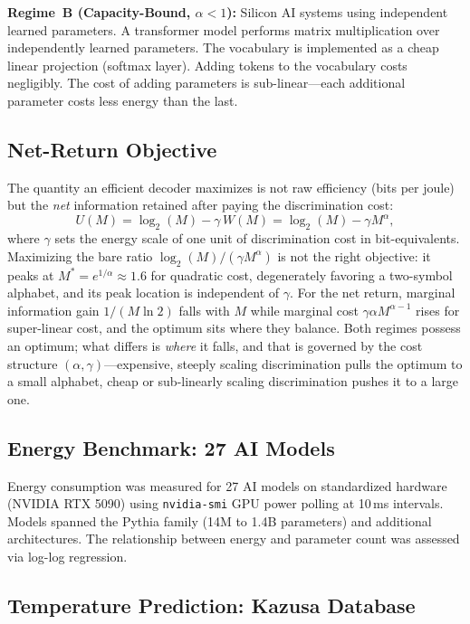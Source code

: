 \documentclass[11pt]{article}
\begin{document}
\textbf{Regime~B (Capacity-Bound, $\alpha < 1$):} Silicon AI systems using independent learned parameters. A transformer model performs matrix multiplication over independently learned parameters. The vocabulary is implemented as a cheap linear projection (softmax layer). Adding tokens to the vocabulary costs negligibly. The cost of adding parameters is sub-linear---each additional parameter costs less energy than the last.

\subsection{Net-Return Objective}

The quantity an efficient decoder maximizes is not raw efficiency (bits per joule) but the \emph{net} information retained after paying the discrimination cost:
\begin{equation}
U(M) = \log_2(M) - \gamma\, W(M) = \log_2(M) - \gamma M^\alpha,
\end{equation}
where $\gamma$ sets the energy scale of one unit of discrimination cost in bit-equivalents. Maximizing the bare ratio $\log_2(M)/(\gamma M^\alpha)$ is not the right objective: it peaks at $M^*=e^{1/\alpha}\approx 1.6$ for quadratic cost, degenerately favoring a two-symbol alphabet, and its peak location is independent of $\gamma$. For the net return, marginal information gain $1/(M\ln 2)$ falls with $M$ while marginal cost $\gamma\alpha M^{\alpha-1}$ rises for super-linear cost, and the optimum sits where they balance. Both regimes possess an optimum; what differs is \emph{where} it falls, and that is governed by the cost structure $(\alpha,\gamma)$---expensive, steeply scaling discrimination pulls the optimum to a small alphabet, cheap or sub-linearly scaling discrimination pushes it to a large one.

\subsection{Energy Benchmark: 27 AI Models}

Energy consumption was measured for 27 AI models on standardized hardware (NVIDIA RTX 5090) using \texttt{nvidia-smi} GPU power polling at 10\,ms intervals. Models spanned the Pythia family (14M to 1.4B parameters) and additional architectures. The relationship between energy and parameter count was assessed via log-log regression.

\subsection{Temperature Prediction: Kazusa Database}
\end{document}
